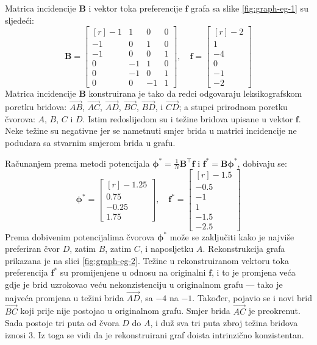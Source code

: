 \documentclass[lmodern, utf8, diplomski, numeric]{fer}
\newcommand{\matr}[1]{\mathbold{#1}}
\newcommand{\T}{\top}
\begin{document}
  Matrica incidencije $\matr{B}$ i vektor toka preferencije $\matr{f}$ grafa sa slike \ref{fig:graph-eg-1} su sljedeći:
  \begin{equation*}
  \matr{B} = \begin{bmatrix*}[r]
  -1 & 1 & 0 & 0 \\
  -1 & 0 & 1 & 0 \\
  -1 & 0 & 0 & 1 \\
  0 & -1 & 1 & 0 \\
  0 & -1 & 0 & 1 \\
  0 & 0 & -1 & 1
  \end{bmatrix*},\quad
  \matr{f} = \begin{bmatrix*}[r]
  -2 \\ 1 \\ -4 \\ 0 \\ -1 \\ -2
  \end{bmatrix*}
  \end{equation*}
  Matrica incidencije $\matr{B}$ konstruirana je tako da redci odgovaraju leksikografskom poretku bridova: $\overrightarrow{AB}$, $\overrightarrow{AC}$, $\overrightarrow{AD}$, $\overrightarrow{BC}$, $\overrightarrow{BD}$, i $\overrightarrow{CD}$; a stupci prirodnom poretku čvorova: $A$, $B$, $C$ i $D$.
  Istim redoslijedom su i težine bridova upisane u vektor $\matr{f}$.
  Neke težine su negativne jer se nametnuti smjer brida u matrici incidencije ne podudara sa stvarnim smjerom brida u grafu.
  
  Računanjem prema metodi potencijala $\matr{\phi^*} = \frac{1}{N}\matr{B}^\T \matr{f}$ i $\matr{f^*} = \matr{B} \matr{\phi^*}$, dobivaju se:
  \begin{equation*}
  \matr{\phi}^* = \begin{bmatrix*}[r]
  -1.25 \\ 0.75 \\ -0.25 \\ 1.75
  \end{bmatrix*}, \quad
  \matr{f}^* = \begin{bmatrix*}[r]
  -1.5 \\ -0.5 \\ -1 \\ 1 \\ -1.5 \\ -2.5
  \end{bmatrix*}
  \end{equation*}
  Prema dobivenim potencijalima čvorova $\matr{\phi}^*$ može se zaključiti kako je najviše preferiran čvor $D$, zatim $B$, zatim $C$, i naposljetku $A$.
  Rekonstrukcija grafa prikazana je na slici \ref{fig:graph-eg-2}.
  Težine u rekonstruiranom vektoru toka preferencija $\matr{f}^*$ su promijenjene u odnosu na originalni $\matr{f}$, i to je promjena veća gdje je brid uzrokovao veću nekonzistenciju u originalnom grafu --- tako je najveća promjena u težini brida $\overrightarrow{AD}$, sa $-4$ na $-1$.
  Također, pojavio se i novi brid $\overrightarrow{BC}$ koji prije nije postojao u originalnom grafu.
  Smjer brida $\overrightarrow{AC}$ je preokrenut.
  Sada postoje tri puta od čvora $D$ do $A$, i duž sva tri puta zbroj težina bridova iznosi 3.
  Iz toga se vidi da je rekonstruirani graf doista intrinzično konzistentan.
  
\end{document}
